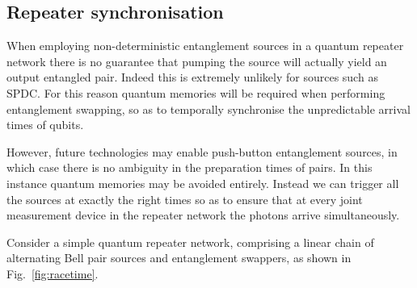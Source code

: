 

%
%

\subsection{Repeater synchronisation}

When employing non-deterministic entanglement sources in a quantum repeater network there is no guarantee that pumping the source will actually yield an output entangled pair. Indeed this is extremely unlikely for sources such as SPDC. For this reason quantum memories will be required when performing entanglement swapping, so as to temporally synchronise the unpredictable arrival times of qubits.

However, future technologies may enable push-button entanglement sources, in which case there is no ambiguity in the preparation times of pairs. In this instance quantum memories may be avoided entirely. Instead we can trigger all the sources at exactly the right times so as to ensure that at every joint measurement device in the repeater network the photons arrive simultaneously.

Consider a simple quantum repeater network, comprising a linear chain of alternating Bell pair sources and entanglement swappers, as shown in Fig.~\ref{fig:racetime}.

